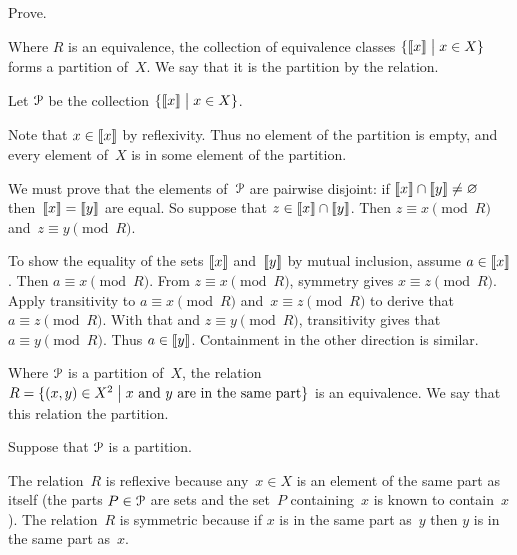\documentclass{test}  %
\begin{document}
\begin{problem} \label{ex:EquivClassesFormPartition}
Prove.
\begin{exes}
\begin{exercise} 
  Where $R$ is an equivalence, 
  the collection of equivalence classes 
  $\{\llbracket x \rrbracket \bigm| x\in X\}$ forms a partition of~$X$.
  We say that it is the partition  by the relation.
\end{exercise}
\begin{answer}
  Let $\EuScript{P}$ be the collection $\{\llbracket x \rrbracket \bigm| x\in X\}$.
 
  Note that $x\in\llbracket x \rrbracket$ by reflexivity.
  Thus no element of the partition is empty, and 
  every element of~$X$ is in some element of the partition.

  We must prove that the elements of~$\EuScript{P}$ are pairwise disjoint:
  if $\llbracket x \rrbracket\cap\llbracket y \rrbracket\neq\varnothing$
  then~$\llbracket x \rrbracket=\llbracket y \rrbracket$ are equal.
  So suppose that $z\in\llbracket x \rrbracket\cap\llbracket y \rrbracket$.
  Then $z\equiv x\pmod R$ and~$z\equiv y\pmod R$.

  To show the equality of the sets $\llbracket x \rrbracket$ and~$\llbracket y \rrbracket$ 
  by mutual inclusion, assume $a\in\llbracket x \rrbracket$.
  Then $a\equiv x\pmod R$.
  From $z\equiv x\pmod R$, symmetry gives $x\equiv z\pmod R$.
  Apply transitivity to $a\equiv x\pmod R$ and~$x\equiv z\pmod R$ to
  derive that $a\equiv z\pmod R$.
  With that and $z\equiv y\pmod R$, transitivity gives
  that $a\equiv y\pmod R$. 
  Thus $a\in\llbracket y \rrbracket$.
  Containment in the other direction is similar.    
\end{answer}
\begin{exercise} 
  Where $\EuScript{P}$ is a partition of~$X$, 
  the relation 
  $R=\{(x,y)\in X^2 \bigm| \text{$x$ and~$y$ are in the same part}\}$ 
  is an equivalence.
  We say that this relation  the partition. 
\end{exercise}
\begin{answer}
  Suppose that $\EuScript{P}$ is a partition. 

  The relation~$R$ is reflexive because any~$x\in X$ is an element of
  the same part as itself
  (the parts $P\in\EuScript{P}$ are sets and the set~$P$ containing~$x$
  is known to contain~$x$).
  The relation~$R$ is symmetric because if $x$ is in the same part as~$y$
  then $y$ is in the same part as~$x$.


\end{answer}
\end{exes}
\end{problem}
\end{document}

